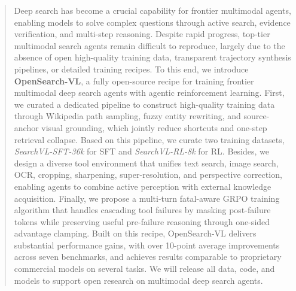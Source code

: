 \begin{abstract}
Deep search has become a crucial capability for frontier multimodal agents, enabling models to solve complex questions through active search, evidence verification, and multi-step reasoning. Despite rapid progress, top-tier multimodal search agents remain difficult to reproduce, largely due to the absence of open high-quality training data, transparent trajectory synthesis pipelines, or detailed training recipes. To this end, we introduce \textbf{OpenSearch-VL}, a fully open-source recipe for training frontier multimodal deep search agents with agentic reinforcement learning. First, we curated a dedicated pipeline to construct high-quality training data through Wikipedia path sampling, fuzzy entity rewriting, and source-anchor visual grounding, which jointly reduce shortcuts and one-step retrieval collapse. Based on this pipeline, we curate two training datasets, \emph{SearchVL-SFT-36k} for SFT and \emph{SearchVL-RL-8k} for RL. Besides, we design a diverse tool environment that unifies text search, image search, OCR, cropping, sharpening, super-resolution, and perspective correction, enabling agents to combine active perception with external knowledge acquisition. Finally, we propose a multi-turn fatal-aware GRPO training algorithm that handles cascading tool failures by masking post-failure tokens while preserving useful pre-failure reasoning through one-sided advantage clamping. Built on this recipe, OpenSearch-VL delivers substantial performance gains, with over 10-point average improvements across seven benchmarks, and achieves results comparable to proprietary commercial models on several tasks. We will release all data, code, and models to support open research on multimodal deep search agents.
\end{abstract}
